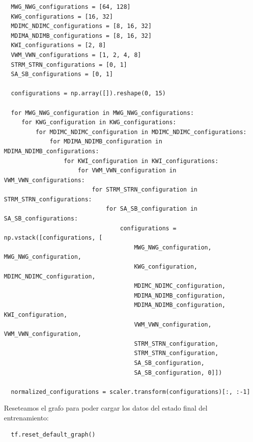 \documentclass[osajnl,twocolumn,showpacs,superscriptaddress,10pt]{revtex4-1} %
\begin{document}
\begin{verbatim}
  MWG_NWG_configurations = [64, 128]
  KWG_configurations = [16, 32]
  MDIMC_NDIMC_configurations = [8, 16, 32]
  MDIMA_NDIMB_configurations = [8, 16, 32]
  KWI_configurations = [2, 8]
  VWM_VWN_configurations = [1, 2, 4, 8]
  STRM_STRN_configurations = [0, 1]
  SA_SB_configurations = [0, 1]

  configurations = np.array([]).reshape(0, 15)

  for MWG_NWG_configuration in MWG_NWG_configurations:
     for KWG_configuration in KWG_configurations:
         for MDIMC_NDIMC_configuration in MDIMC_NDIMC_configurations:
             for MDIMA_NDIMB_configuration in MDIMA_NDIMB_configurations:
                 for KWI_configuration in KWI_configurations:
                     for VWM_VWN_configuration in VWM_VWN_configurations:
                         for STRM_STRN_configuration in STRM_STRN_configurations:
                             for SA_SB_configuration in SA_SB_configurations:
                                 configurations = np.vstack([configurations, [
                                     MWG_NWG_configuration, MWG_NWG_configuration,
                                     KWG_configuration, MDIMC_NDIMC_configuration,
                                     MDIMC_NDIMC_configuration,
                                     MDIMA_NDIMB_configuration,
                                     MDIMA_NDIMB_configuration, KWI_configuration,
                                     VWM_VWN_configuration, VWM_VWN_configuration,
                                     STRM_STRN_configuration,
                                     STRM_STRN_configuration,
                                     SA_SB_configuration,
                                     SA_SB_configuration, 0]])

  normalized_configurations = scaler.transform(configurations)[:, :-1]
\end{verbatim}

Reseteamos el grafo para poder cargar los datos del estado final del entrenamiento:

\begin{verbatim}
  tf.reset_default_graph()
\end{verbatim}
\end{document}
